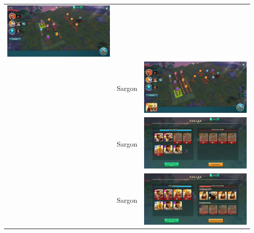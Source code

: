 \begin{longtable}{|c|c|c|}
    \includegraphics[width=0.75\linewidth]{./parts/media/TreasureHunt/36/sargon/photo_2022-04-07_13-16-43.jpg} \\
    & Sargon &
    \includegraphics[width=0.75\linewidth]{./parts/media/TreasureHunt/36/sargon/photo_2022-04-07_13-16-23.jpg} \\
    & Sargon &
    \includegraphics[width=0.75\linewidth]{./parts/media/TreasureHunt/36/sargon/photo_2022-04-07_13-16-46.jpg} \\
    & Sargon &
    \includegraphics[width=0.75\linewidth]{./parts/media/TreasureHunt/36/sargon/photo_2022-04-07_13-16-40.jpg} \\

\end{longtable}

